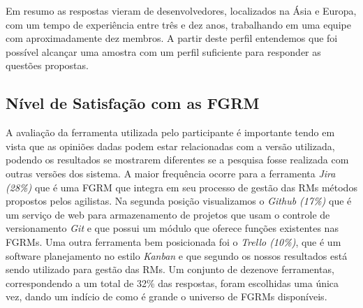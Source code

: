 
Em resumo as respostas vieram de desenvolvedores, localizados na Ásia e Europa,
com um tempo de experiência entre três e dez anos, trabalhando em uma equipe com
aproximadamente dez membros. A partir deste perfil entendemos que foi possível
alcançar uma amostra com um perfil suficiente para responder as questões
propostas.

\subsection{Nível de Satisfação com as FGRM}
\label{sub:nivel_de_satisfação_com_as_fgrm}

A avaliação da ferramenta utilizada pelo participante é importante tendo em
vista que as opiniões dadas podem estar relacionadas com a versão utilizada,
podendo os resultados se mostrarem diferentes se a pesquisa fosse realizada com
outras versões dos sistema. A maior frequência ocorre para a ferramenta
\textit{Jira (28\%)} que é uma FGRM que integra em seu processo de gestão das
RMs métodos propostos pelos agilistas. Na segunda posição visualizamos o
\textit{Github (17\%)} que é um serviço de web para armazenamento de projetos
que usam o controle de versionamento \textit{Git} e que possui um módulo que
oferece funções existentes nas FGRMs. Uma outra ferramenta bem posicionada foi o
\textit{Trello (10\%)}, que é um software planejamento no estilo \textit{Kanban}
e que segundo os nossos resultados está sendo utilizado para gestão das RMs. Um
conjunto de dezenove ferramentas, correspondendo a um total de 32\% das
respostas, foram escolhidas uma única vez, dando um indício de como é grande o
universo de FGRMs disponíveis.


